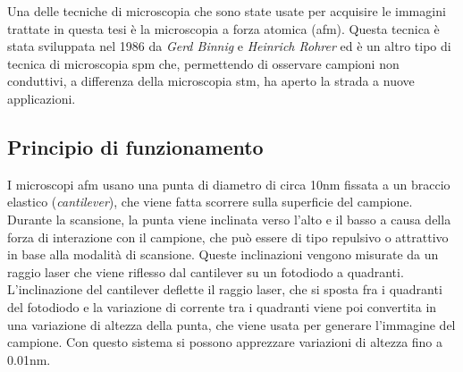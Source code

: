 \documentclass[../main.tex]{subfiles}
\begin{document}
Una delle tecniche di microscopia che sono state usate per acquisire le immagini trattate in questa tesi è la microscopia a forza atomica (\acrshort{afm}). Questa tecnica è stata sviluppata nel 1986 da \textit{Gerd Binnig} e \textit{Heinrich Rohrer} ed è un altro tipo di tecnica di microscopia \acrshort{spm} che, permettendo di osservare campioni non conduttivi, a differenza della microscopia \acrshort{stm}, ha aperto la strada a nuove applicazioni.\cite{binnig_1986}

\subsection{Principio di funzionamento}

I microscopi \acrshort{afm} usano una punta di diametro di circa 10nm fissata a un braccio elastico (\textit{cantilever}), che viene fatta scorrere sulla superficie del campione. Durante la scansione, la punta viene inclinata verso l'alto e il basso a causa della forza di interazione con il campione, che può essere di tipo repulsivo o attrattivo in base alla modalità di scansione. Queste inclinazioni vengono misurate da un raggio laser che viene riflesso dal cantilever su un fotodiodo a quadranti. L'inclinazione del cantilever deflette il raggio laser, che si sposta fra i quadranti del fotodiodo e la variazione di corrente tra i quadranti viene poi convertita in una variazione di altezza della punta, che viene usata per generare l'immagine del campione. Con questo sistema si possono apprezzare variazioni di altezza fino a 0.01nm.\cite{sun_2018}
\end{document}
